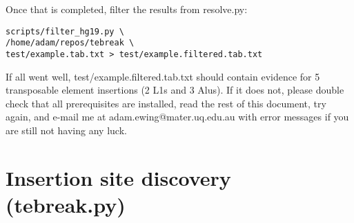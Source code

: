 \documentclass[letterpaper,11pt]{article}
\begin{document}
Once that is completed, filter the results from resolve.py:

\begin{verbatim}
scripts/filter_hg19.py \
/home/adam/repos/tebreak \
test/example.tab.txt > test/example.filtered.tab.txt
\end{verbatim}

If all went well, test/example.filtered.tab.txt should contain evidence for 5 transposable element insertions (2 L1s and 3 Alus). If it does not, please double check that all prerequisites are installed, read the rest of this document, try again, and e-mail me at adam.ewing@mater.uq.edu.au with error messages if you are still not having any luck.

\section{Insertion site discovery (tebreak.py)}
\end{document}
